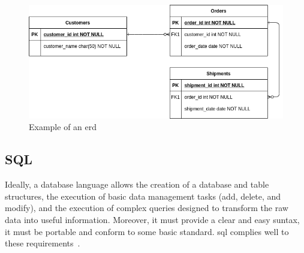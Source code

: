 %
\begin{figure}[htb!]
\centering
    \includegraphics[width=0.8\columnwidth]{./img/erd-example.png}
  \caption{Example of an \gls{erd}}%
\label{fig:erd-example}
\end{figure}
%




\subsection{SQL}
\label{sec:sql}
Ideally, a database language allows the creation of a database and table
structures, the execution of basic data management tasks (add, delete, and
modify), and the execution of complex queries designed to transform the raw data
into useful information. Moreover, it must provide a clear and easy suntax, it
must be portable and conform to some basic standard. \gls{sql} complies well to
these requirements~\cite{coronel2016database}.

